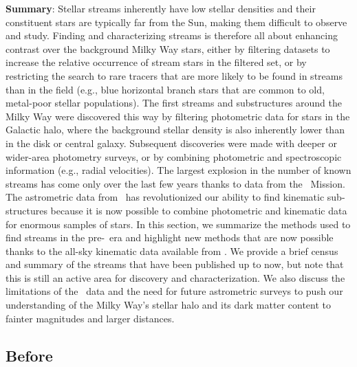\documentclass[final,5p,times,twocolumn,authoryear]{elsarticle}
\begin{document}

\textbf{Summary}: Stellar streams inherently have low stellar densities and their
constituent stars are typically far from the Sun, making them difficult to observe and
study.
Finding and characterizing streams is therefore all about enhancing contrast over the
background Milky Way stars, either by filtering datasets to increase the relative
occurrence of stream stars in the filtered set, or by restricting the search to rare
tracers that are more likely to be found in streams than in the field (e.g., blue
horizontal branch stars that are common to old, metal-poor stellar populations).
The first streams and substructures around the Milky Way were discovered this way by
filtering photometric data for stars in the Galactic halo, where the background stellar
density is also inherently lower than in the disk or central galaxy.
Subsequent discoveries were made with deeper or wider-area photometry surveys, or by
combining photometric and spectroscopic information (e.g., radial velocities).
The largest explosion in the number of known streams has come only over the last few
years thanks to data from the \gaia\ Mission.
The astrometric data from \gaia\ has revolutionized our ability to find kinematic
sub-structures because it is now possible to combine photometric and kinematic data for
enormous samples of stars.
In this section, we summarize the methods used to find streams in the pre-\gaia\ era and
highlight new methods that are now possible thanks to the all-sky kinematic data
available from \gaia.
We provide a brief census and summary of the streams that have been published up to now,
but note that this is still an active area for discovery and characterization.
We also discuss the limitations of the \gaia\ data and the need for future astrometric
surveys to push our understanding of the Milky Way's stellar halo and its dark matter
content to fainter magnitudes and larger distances.


\subsection{Before \gaia}
\end{document}
